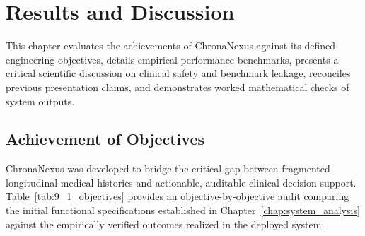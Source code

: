 \chapter{Results and Discussion}
\label{chap:results_discussion}

This chapter evaluates the achievements of ChronaNexus against its defined engineering objectives, details empirical performance benchmarks, presents a critical scientific discussion on clinical safety and benchmark leakage, reconciles previous presentation claims, and demonstrates worked mathematical checks of system outputs.

\section{Achievement of Objectives}
\label{sec:achievement_objectives}

ChronaNexus was developed to bridge the critical gap between fragmented longitudinal medical histories and actionable, auditable clinical decision support. Table~\ref{tab:9_1_objectives} provides an objective-by-objective audit comparing the initial functional specifications established in Chapter~\ref{chap:system_analysis} against the empirically verified outcomes realized in the deployed system.

